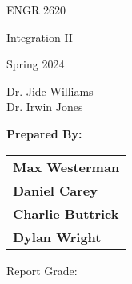 \documentclass[11pt]{report}
\begin{document}
\begin{titlepage}
    
    \centering
    
    \Large{ENGR 2620}
    
    \Large{Integration II}
    
    \Large{Spring 2024}

    \vspace{0.5cm}
    
    \Huge \textsc{\TITLENAME}

    \vfill
    
    \vspace{1cm}
    
    \large{Dr. Jide Williams} \\
    \large{Dr. Irwin Jones}
    
    \vspace{0.8cm}

    \large \textbf{Prepared By:}
    \hspace{1.3cm} \begin{tabular}[t]{@{}l@{}}
        \textbf{Max Westerman}\\
        \textbf{Daniel Carey}\\
        \textbf{Charlie Buttrick}\\
        \textbf{Dylan Wright}\\
    \end{tabular}
    \vspace{10pt}
    
    \vfill
    \hfill \large Report Grade: \underline{\hspace{4cm}}
        
\end{titlepage}
\end{document}

